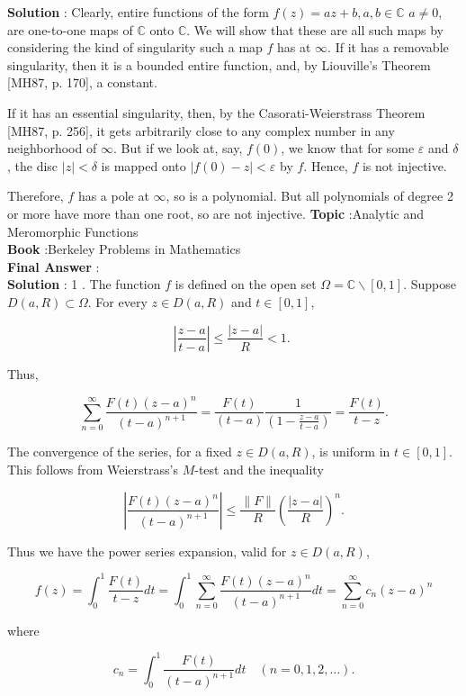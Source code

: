 \documentclass[10pt]{article}
\begin{document}
\textbf{Solution} : Clearly, entire functions of the form $f(z)=a z+b, a, b \in \mathbb{C}$ $a \neq 0$, are one-to-one maps of $\mathbb{C}$ onto $\mathbb{C}$. We will show that these are all such maps by considering the kind of singularity such a map $f$ has at $\infty$. If it has a removable singularity, then it is a bounded entire function, and, by Liouville's Theorem [MH87, p. 170], a constant.

If it has an essential singularity, then, by the Casorati-Weierstrass Theorem [MH87, p. 256], it gets arbitrarily close to any complex number in any neighborhood of $\infty$. But if we look at, say, $f(0)$, we know that for some $\varepsilon$ and $\delta$, the disc $|z|<\delta$ is mapped onto $|f(0)-z|<\varepsilon$ by $f$. Hence, $f$ is not injective.

Therefore, $f$ has a pole at $\infty$, so is a polynomial. But all polynomials of degree 2 or more have more than one root, so are not injective.
\textbf{Topic} :Analytic and Meromorphic Functions \\
\textbf{Book} :Berkeley Problems in Mathematics\\
\textbf{Final Answer} :\\


\textbf{Solution} : 1 . The function $f$ is defined on the open set $\Omega=\mathbb{C} \backslash[0,1]$. Suppose $D(a, R) \subset \Omega$. For every $z \in D(a, R)$ and $t \in[0,1]$,

$$
\left|\frac{z-a}{t-a}\right| \leqslant \frac{|z-a|}{R}<1 \text {. }
$$

Thus,

$$
\sum_{n=0}^{\infty} \frac{F(t)(z-a)^{n}}{(t-a)^{n+1}}=\frac{F(t)}{(t-a)} \frac{1}{\left(1-\frac{z-a}{t-a}\right)}=\frac{F(t)}{t-z} .
$$

The convergence of the series, for a fixed $z \in D(a, R)$, is uniform in $t \in[0,1]$. This follows from Weierstrass's $M$-test and the inequality

$$
\left|\frac{F(t)(z-a)^{n}}{(t-a)^{n+1}}\right| \leqslant \frac{\|F\|}{R}\left(\frac{|z-a|}{R}\right)^{n} .
$$

Thus we have the power series expansion, valid for $z \in D(a, R)$,

$$
f(z)=\int_{0}^{1} \frac{F(t)}{t-z} d t=\int_{0}^{1} \sum_{n=0}^{\infty} \frac{F(t)(z-a)^{n}}{(t-a)^{n+1}} d t=\sum_{n=0}^{\infty} c_{n}(z-a)^{n}
$$

where

$$
c_{n}=\int_{0}^{1} \frac{F(t)}{(t-a)^{n+1}} d t \quad(n=0,1,2, \ldots) .
$$
\end{document}
